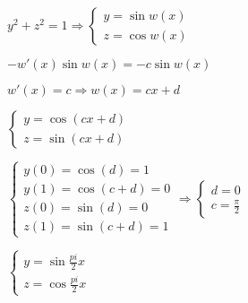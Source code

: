 \documentclass[russian]{article}
\begin{document}
$y^2 + z^2 = 1 \Rightarrow 
\begin{cases}
y = \sin w(x) \\
z = \cos w(x)
\end{cases}$

$-w'(x)\sin w(x)=-c \sin w(x)$

$w'(x)=c \Rightarrow w(x)=c x+d$

$\begin{cases}
y=\cos (cx+d) \\
z=\sin (cx+d)
\end{cases}$ 

$\begin{cases}
y(0) =\cos (d) = 1 \\
y(1) = \cos (c+d) = 0 \\
z(0) = \sin (d) = 0 \\
z(1) = \sin (c + d) = 1
\end{cases}
\Rightarrow 
\begin{cases}
d = 0 \\
c = \frac{\pi}{2}
\end{cases}$

$\begin{cases}
y = \sin \frac{pi}{2} x \\
z = \cos \frac{pi}{2} x
\end{cases}$
\end{document}

